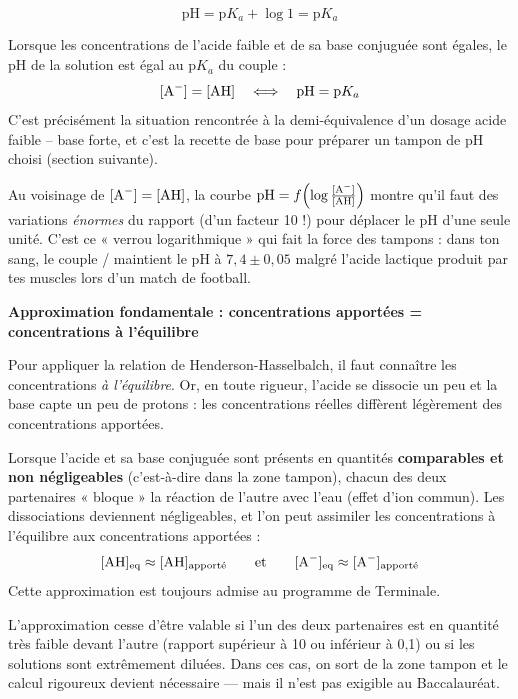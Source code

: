 \documentclass[11pt]{article}
\newcommand{\cle}[1]{{\popxbold\color{popdark}#1}}
\begin{document}
\[ \text{pH} = \text{p}K_a + \log 1 = \text{p}K_a \]

\begin{propriete}
Lorsque les concentrations de l'acide faible et de sa base conjuguée sont égales, le pH de la solution est égal au p$K_a$ du couple :
\[ [\ce{A-}] = [\ce{AH}] \quad \Longleftrightarrow \quad \text{pH} = \text{p}K_a \]
C'est précisément la situation rencontrée à la \cle{demi-équivalence} d'un dosage acide faible -- base forte, et c'est la recette de base pour préparer un tampon de pH choisi (section suivante).
\end{propriete}

\begin{savaistu}
Au voisinage de $[\ce{A-}] = [\ce{AH}]$, la courbe $\text{pH} = f\!\left(\log\frac{[\ce{A-}]}{[\ce{AH}]}\right)$ montre qu'il faut des variations \emph{énormes} du rapport (d'un facteur 10 !) pour déplacer le pH d'une seule unité. C'est ce « verrou logarithmique » qui fait la force des tampons : dans ton sang, le couple / maintient le pH à $7{,}4 \pm 0{,}05$ malgré l'acide lactique produit par tes muscles lors d'un match de football.
\end{savaistu}

\textbf{Approximation fondamentale : concentrations apportées = concentrations à l'équilibre}\par
Pour appliquer la relation de Henderson-Hasselbalch, il faut connaître les concentrations \emph{à l'équilibre}. Or, en toute rigueur, l'acide  se dissocie un peu et la base  capte un peu de protons : les concentrations réelles diffèrent légèrement des concentrations apportées.

\begin{propriete}
Lorsque l'acide et sa base conjuguée sont présents en quantités \textbf{comparables et non négligeables} (c'est-à-dire dans la zone tampon), chacun des deux partenaires « bloque » la réaction de l'autre avec l'eau (effet d'ion commun). Les dissociations deviennent négligeables, et l'on peut assimiler les concentrations à l'équilibre aux concentrations apportées :
\[ [\ce{AH}]_{\text{eq}} \approx [\ce{AH}]_{\text{apporté}} \qquad \text{et} \qquad [\ce{A-}]_{\text{eq}} \approx [\ce{A-}]_{\text{apporté}} \]
Cette approximation est toujours admise au programme de Terminale.
\end{propriete}

\begin{attention}
L'approximation cesse d'être valable si l'un des deux partenaires est en quantité très faible devant l'autre (rapport supérieur à 10 ou inférieur à 0,1) ou si les solutions sont extrêmement diluées. Dans ces cas, on sort de la zone tampon et le calcul rigoureux devient nécessaire — mais il n'est pas exigible au Baccalauréat.
\end{attention}
\end{document}
